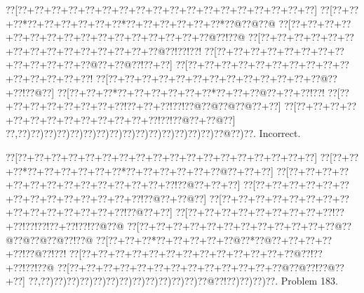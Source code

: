 \documentclass[a5paper]{article}
\begin{document}
\begin{center}
{\goo
\0??[\0??+\0??+\0??+\0??+\0??+\0??+\0??+\0??+\0??+\0??+\0??+\0??+\0??+\0??+\0??+\0??+\0??+\0??]
\0??[\0??+\0??+\0??*\0??+\0??+\0??+\0??+\0??+\0??*\0??+\0??+\0??+\0??+\0??+\0??*\0??@\0??@\0??@
\0??[\0??+\0??+\0??+\0??+\0??+\0??+\0??+\0??+\0??+\0??+\0??+\0??+\0??+\0??+\0??+\0??@\0??!\0??@
\0??[\0??+\0??+\0??+\0??+\0??+\0??+\0??+\0??+\0??+\0??+\0??+\0??+\0??+\0??+\0??@\0??!\0??!\0??!
\0??[\0??+\0??+\0??+\0??+\0??+\0??+\0??+\0??+\0??+\0??+\0??+\0??+\0??@\0??+\0??@\0??!\0??+\0??]
\0??[\0??+\0??+\0??+\0??+\0??+\0??+\0??+\0??+\0??+\0??+\0??+\0??+\0??+\0??+\0??!
\0??[\0??+\0??+\0??+\0??+\0??+\0??+\0??+\0??+\0??+\0??+\0??+\0??+\0??@\0??+\0??!\0??@\0??]
\0??[\0??+\0??+\0??*\0??+\0??+\0??+\0??+\0??+\0??*\0??+\0??+\0??@\0??+\0??+\0??!\0??!
\0??[\0??+\0??+\0??+\0??+\0??+\0??+\0??+\0??!\0??+\0??+\0??!\0??!\0??@\0??@\0??@\0??@\0??+\0??]
\0??[\0??+\0??+\0??+\0??+\0??+\0??+\0??+\0??+\0??+\0??+\0??+\0??+\0??!\0??!\0??@\0??+\0??@\0??]
\0??,\0??)\0??)\0??)\0??)\0??)\0??)\0??)\0??)\0??)\0??)\0??)\0??)\0??)\0??)\0??)\0??@\0??)\0??.
}
Incorrect. 

\end{center}
\newpage
\begin{center}
{\goo
\0??[\0??+\0??+\0??+\0??+\0??+\0??+\0??+\0??+\0??+\0??+\0??+\0??+\0??+\0??+\0??+\0??+\0??+\0??]
\0??[\0??+\0??+\0??*\0??+\0??+\0??+\0??+\0??+\0??*\0??+\0??+\0??+\0??+\0??+\0??@\0??+\0??+\0??]
\0??[\0??+\0??+\0??+\0??+\0??+\0??+\0??+\0??+\0??+\0??+\0??+\0??+\0??+\0??!\0??@\0??+\0??+\0??]
\0??[\0??+\0??+\0??+\0??+\0??+\0??+\0??+\0??+\0??+\0??+\0??+\0??+\0??+\0??!\0??@\0??+\0??@\0??]
\0??[\0??+\0??+\0??+\0??+\0??+\0??+\0??+\0??+\0??+\0??+\0??+\0??+\0??+\0??+\0??!\0??@\0??+\0??]
\0??[\0??+\0??+\0??+\0??+\0??+\0??+\0??+\0??+\0??!\0??+\0??!\0??!\0??!\0??+\0??!\0??!\0??@\0??@
\0??[\0??+\0??+\0??+\0??+\0??+\0??+\0??+\0??+\0??+\0??+\0??+\0??@\0??@\0??@\0??@\0??@\0??!\0??@
\0??[\0??+\0??+\0??*\0??+\0??+\0??+\0??+\0??@\0??*\0??@\0??+\0??+\0??+\0??+\0??!\0??@\0??!\0??!
\0??[\0??+\0??+\0??+\0??+\0??+\0??+\0??+\0??+\0??+\0??+\0??+\0??+\0??@\0??!\0??+\0??!\0??!\0??@
\0??[\0??+\0??+\0??+\0??+\0??+\0??+\0??+\0??+\0??+\0??+\0??+\0??+\0??@\0??@\0??!\0??@\0??+\0??]
\0??,\0??)\0??)\0??)\0??)\0??)\0??)\0??)\0??)\0??)\0??)\0??)\0??)\0??@\0??!\0??)\0??)\0??)\0??.
}
Problem 183.

\end{center}
\end{document}
